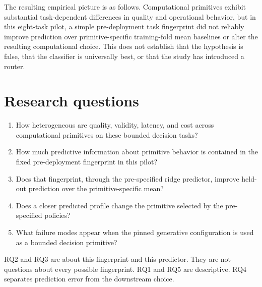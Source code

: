 The resulting empirical picture is as follows. Computational primitives exhibit substantial task-dependent differences in quality and operational behavior, but in this eight-task pilot, a simple pre-deployment task fingerprint did not reliably improve prediction over primitive-specific training-fold mean baselines or alter the resulting computational choice. This does not establish that the hypothesis is false, that the classifier is universally best, or that the study has introduced a router.

\section{Research questions}
\label{sec:rqs}

\begin{enumerate}[label=RQ\arabic*.]
\item How heterogeneous are quality, validity, latency, and cost across computational primitives on these bounded decision tasks?
\item How much predictive information about primitive behavior is contained in the fixed pre-deployment fingerprint in this pilot?
\item Does that fingerprint, through the pre-specified ridge predictor, improve held-out prediction over the primitive-specific mean?
\item Does a closer predicted profile change the primitive selected by the pre-specified policies?
\item What failure modes appear when the pinned generative configuration is used as a bounded decision primitive?
\end{enumerate}

\noindent RQ2 and RQ3 are about this fingerprint and this predictor. They are not questions about every possible fingerprint. RQ1 and RQ5 are descriptive. RQ4 separates prediction error from the downstream choice.
